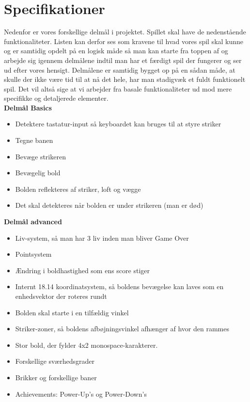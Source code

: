 \chapter{Specifikationer}

Nedenfor er vores forskellige delmål i projektet. Spillet skal have de nedenstående funktionaliteter. Listen kan derfor ses som kravene til hvad vores spil skal kunne og er samtidig opdelt på en logisk måde så man kan starte fra toppen af og arbejde sig igennem delmålene indtil man har et færdigt spil der fungerer og ser ud efter vores hensigt. Delmålene er samtidig bygget op på en sådan måde, at skulle der ikke være tid til at nå det hele, har man stadigvæk et fuldt funktionelt spil. Det vil altså sige at vi arbejder fra basale funktionaliteter ud mod mere specifikke og detaljerede elementer.\\

\textbf{Delmål Basics}
\begin{itemize}
\item Detektere tastatur-input så keyboardet kan bruges til at styre striker
\item Tegne banen
\item Bevæge strikeren
\item Bevægelig bold
\item Bolden reflekteres af striker, loft og vægge
\item Det skal detekteres når bolden er under strikeren (man er død)
\end{itemize}

\textbf{Delmål advanced}
\begin{itemize}
\item Liv-system, så man har 3 liv inden man bliver Game Over
\item Pointsystem
\item Ændring i boldhastighed som ens score stiger
\item Internt 18.14 koordinatsystem, så boldens bevægelse kan laves som en enhedsvektor der roteres rundt
\item Bolden skal starte i en tilfældig vinkel
\item Striker-zoner, så boldens afbøjningsvinkel afhænger af hvor den rammes 
\item Stor bold, der fylder 4x2 monospace-karakterer.
\item {Forskellige sværhedsgrader}
\item {Brikker og forskellige baner}
\item Achievements: Power-Up's og Power-Down's
\end{itemize}	

